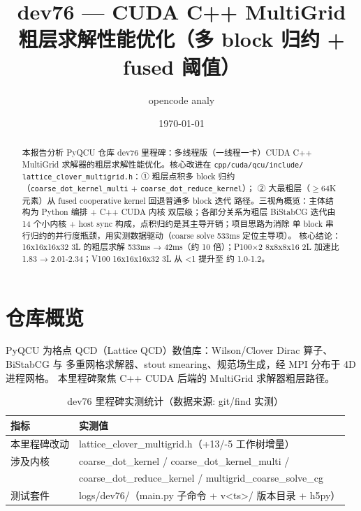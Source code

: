 \documentclass[UTF8]{ctexart}
\title{dev76 --- CUDA C++ MultiGrid 粗层求解性能优化（多 block 归约 + fused 阈值）}
\author{opencode analy}
\date{\today}
\begin{document}
\maketitle

\begin{abstract}
本报告分析 PyQCU 仓库 dev76 里程碑：多线程版（一线程一卡）CUDA C++ MultiGrid
求解器的粗层求解性能优化。核心改进在 \texttt{cpp/cuda/qcu/include/
lattice\_clover\_multigrid.h}：① 粗层点积多 block 归约
（\texttt{coarse\_dot\_kernel\_multi} + \texttt{coarse\_dot\_reduce\_kernel}）；
② 大最粗层（$\ge$64K 元素）从 fused cooperative kernel 回退普通多 block 迭代
路径。三视角概览：\textcolor{struct}{主体结构}为 Python 编排 + C++ CUDA 内核
双层级；\textcolor{relation}{各部分关系}为粗层 BiStabCG 迭代由 14 个小内核 +
host sync 构成，点积归约是其主导开销；\textcolor{idea}{项目思路}为消除
单 block 串行归约的并行度瓶颈，用实测数据驱动（coarse solve 533ms 定位主导项）。
核心结论：16x16x16x32 3L 的粗层求解 533ms → 42ms（约 10 倍）；P100×2
8x8x8x16 2L 加速比 1.83 → 2.01-2.34；V100 16x16x16x32 3L 从 <1 提升至
约 1.0-1.2。
\end{abstract}

\tableofcontents

\section{仓库概览}
PyQCU 为格点 QCD（Lattice QCD）数值库：Wilson/Clover Dirac 算子、BiStabCG 与
多重网格求解器、stout smearing、规范场生成，经 MPI 分布于 4D 进程网格。
本里程碑聚焦 C++ CUDA 后端的 MultiGrid 求解器粗层路径。
\begin{table}[htbp]\centering
\begin{tabular}{ll}
\toprule
指标 & 实测值 \\
\midrule
本里程碑改动 & lattice\_clover\_multigrid.h（+13/-5 工作树增量） \\
涉及内核 & coarse\_dot\_kernel / coarse\_dot\_kernel\_multi / \\
 & coarse\_dot\_reduce\_kernel / multigrid\_coarse\_solve\_cg \\
测试套件 & logs/dev76/（main.py 子命令 + v<ts>/ 版本目录 + h5py） \\
\bottomrule
\end{tabular}
\caption{dev76 里程碑实测统计（数据来源: git/find 实测）}
\end{table}

\end{document}
